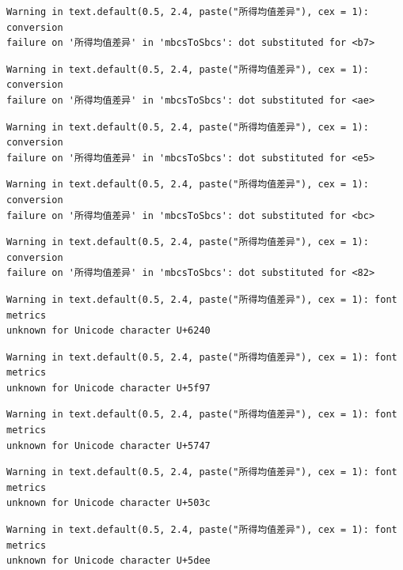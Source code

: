 \documentclass[
  letterpaper,
  DIV=11,
  numbers=noendperiod]{scrreprt}
\begin{document}
\begin{verbatim}
Warning in text.default(0.5, 2.4, paste("所得均值差异"), cex = 1): conversion
failure on '所得均值差异' in 'mbcsToSbcs': dot substituted for <b7>
\end{verbatim}

\begin{verbatim}
Warning in text.default(0.5, 2.4, paste("所得均值差异"), cex = 1): conversion
failure on '所得均值差异' in 'mbcsToSbcs': dot substituted for <ae>
\end{verbatim}

\begin{verbatim}
Warning in text.default(0.5, 2.4, paste("所得均值差异"), cex = 1): conversion
failure on '所得均值差异' in 'mbcsToSbcs': dot substituted for <e5>
\end{verbatim}

\begin{verbatim}
Warning in text.default(0.5, 2.4, paste("所得均值差异"), cex = 1): conversion
failure on '所得均值差异' in 'mbcsToSbcs': dot substituted for <bc>
\end{verbatim}

\begin{verbatim}
Warning in text.default(0.5, 2.4, paste("所得均值差异"), cex = 1): conversion
failure on '所得均值差异' in 'mbcsToSbcs': dot substituted for <82>
\end{verbatim}

\begin{verbatim}
Warning in text.default(0.5, 2.4, paste("所得均值差异"), cex = 1): font metrics
unknown for Unicode character U+6240
\end{verbatim}

\begin{verbatim}
Warning in text.default(0.5, 2.4, paste("所得均值差异"), cex = 1): font metrics
unknown for Unicode character U+5f97
\end{verbatim}

\begin{verbatim}
Warning in text.default(0.5, 2.4, paste("所得均值差异"), cex = 1): font metrics
unknown for Unicode character U+5747
\end{verbatim}

\begin{verbatim}
Warning in text.default(0.5, 2.4, paste("所得均值差异"), cex = 1): font metrics
unknown for Unicode character U+503c
\end{verbatim}

\begin{verbatim}
Warning in text.default(0.5, 2.4, paste("所得均值差异"), cex = 1): font metrics
unknown for Unicode character U+5dee
\end{verbatim}
\end{document}
